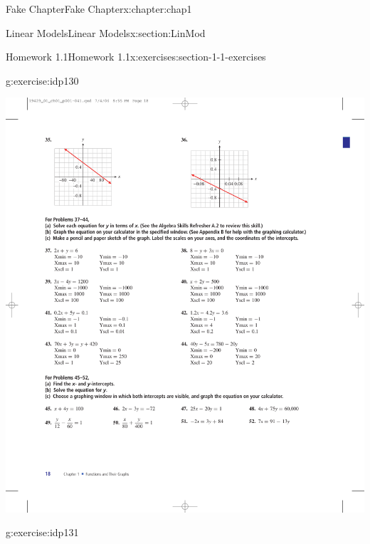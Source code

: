 \documentclass[oneside,10pt,]{book}
\numberwithin{equation}{section}
\begin{document}
\begin{chapterptx}{Fake Chapter}{}{Fake Chapter}{}{}{x:chapter:chap1}
\begin{sectionptx}{Linear Models}{}{Linear Models}{}{}{x:section:LinMod}
\begin{exercises-subsection}{Homework 1.1}{}{Homework 1.1}{}{}{x:exercises:section-1-1-exercises}
\begin{exercisegroupcol}{2}
\begin{divisionexerciseegcol}{35}{}{}{g:exercise:idp130}
\begin{sidebyside}{1}{0.1}{0.1}{0}
\begin{sbspanel}{0.8}
\includegraphics[width=\linewidth]{external/photos/fig-ex-1-1-35.pdf}
\end{sbspanel}%
\end{sidebyside}%
\end{divisionexerciseegcol}%
\begin{divisionexerciseegcol}{36}{}{}{g:exercise:idp131}%
\begin{sidebyside}{1}{0.1}{0.1}{0}%
\begin{sbspanel}{0.8}%

\end{sbspanel}
\end{sidebyside}
\end{divisionexerciseegcol}
\end{exercisegroupcol}
\end{exercises-subsection}
\end{sectionptx}
\end{chapterptx}
\end{document}
